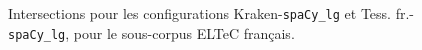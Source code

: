 \begin{figure}[h!]
\caption{Intersections pour les configurations Kraken-\texttt{spaCy\_lg} et Tess. fr.-\texttt{spaCy\_lg}, pour le sous-corpus ELTeC français.}
\label{fig:intersection_globale-kraken-tess}
\end{figure}


